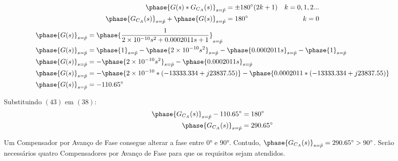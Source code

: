\documentclass[a4paper]{article}
\begin{document}
	\begin{align}
	\phase{G(s)*G_{C_A}(s)}_{s=\hat{p}} &= \pm\ang{180}(2k+1) & k=0,1,2...  \\
	\phase{G_{C_A}(s)}_{s=\hat{p}}+\phase{G(s)}_{s=\hat{p}}&= \ang{180} & k=0
	\end{align}
	\vspace{0.5em}
	\begin{align}
		\phase{G(s)}_{s=\hat{p}} &= \phase{\frac{1}{2\times10^{-10}s^2+0.0002011s+1}}_{s=\hat{p}} \\
		\phase{G(s)}_{s=\hat{p}} &= \phase{1}_{s=\hat{p}}- \phase{2\times10^{-10}s^2}_{s=\hat{p}}- \phase{0.0002011s}_{s=\hat{p}}-\phase{1}_{s=\hat{p}} \\			
		\phase{G(s)}_{s=\hat{p}} &=- \phase{2\times10^{-10}s^2}_{s=\hat{p}}- \phase{0.0002011s}_{s=\hat{p}}\\
		\phase{G(s)}_{s=\hat{p}} &=- \phase{2\times10^{-10}*(-13333.334 + j23837.55)}- \phase{0.0002011*(-13333.334 + j23837.55)}\\
		\phase{G(s)}_{s=\hat{p}} &=-\ang{110.65}
	\end{align}
	\vspace{0.5em}
	\par Substituindo $(43)$ em $(38)$:
	\begin{align}
	\phase{G_{C_A}(s)}_{s=\hat{p}}-\ang{110.65} &= \ang{180} \\
	\phase{G_{C_A}(s)}_{s=\hat{p}} &= \ang{290.65}
	\end{align}
	\vspace{0.5em}
	\par Um Compensador por Avanço de Fase consegue alterar a fase entre $\ang{0}$ e $\ang{90}$. Contudo, $\phase{G_{C_A}(s)}_{s=\hat{p}} = \ang{290.65} > \ang{90}$. Serão necessários quatro Compensadores por Avanço de Fase para que os requisitos sejam atendidos.
	
\end{document}
